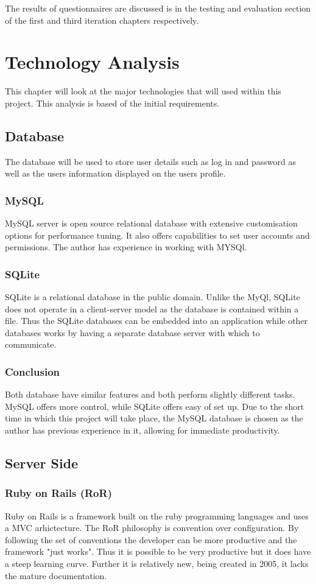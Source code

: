 \documentclass[a4paper,oneside,11pt]{report}
\begin{document}
The results of questionnaires are discussed is in the testing and evaluation section of the first and third iteration chapters respectively.


\chapter{Technology Analysis}
This chapter will look at the major technologies that will used within this project. This analysis is based of the initial requirements. 
\section{Database}
The database will be used to store user details such as log in and password as well as the users information displayed on the users profile.
\subsection{MySQL}
MySQL server is open source relational database with extensive customisation options for performance tuning. It also offers capabilities to set user accounts and permissions. The author has experience in working with MYSQl.
\subsection{SQLite}
SQLite is a relational database in the public domain. Unlike the MyQl, SQLite does not operate in a client-server model as the database is contained within a file. Thus the SQLite databases can be embedded into an application while other databases works by having a separate database server with which to communicate.
\subsection{Conclusion}
Both database have similar features and both perform slightly different tasks. MySQL offers more control, while SQLite offers easy of set up. Due to the short time in which this project will take place, the MySQL database is chosen as the author has previous experience in it, allowing for immediate productivity.

\section{Server Side} 
\subsection{Ruby on Rails (RoR)}  
Ruby on Rails is a framework built on the ruby programming languages and uses a MVC arhictecture. The RoR philosophy is convention over configuration. By following the set of conventions the developer can be more productive and the framework "just works". Thus it is possible to be very productive but it does have a steep learning curve. Further it is relatively new, being created in 2005, it lacks the mature documentation.
\end{document}
